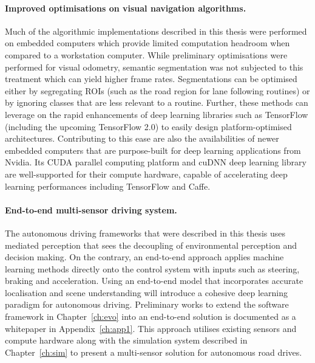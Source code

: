 \paragraph{Improved optimisations on visual navigation algorithms.} Much of the algorithmic implementations described in this thesis were performed on embedded computers which provide limited computation headroom when compared to a workstation computer. While preliminary optimisations were performed for visual odometry, semantic segmentation was not subjected to this treatment which can yield higher frame rates. Segmentations can be optimised either by segregating ROIs (such as the road region for lane following routines) or by ignoring classes that are less relevant to a routine. Further, these methods can leverage on the rapid enhancements of deep learning libraries such as TensorFlow (including the upcoming TensorFlow 2.0) to easily design platform-optimised architectures. Contributing to this ease are also the availabilities of newer embedded computers that are purpose-built for deep learning applications from Nvidia. Its CUDA parallel computing platform and cuDNN deep learning library are well-supported for their compute hardware, capable of accelerating deep learning performances including TensorFlow and Caffe.

\paragraph{End-to-end multi-sensor driving system.} The autonomous driving frameworks that were described in this thesis uses mediated perception that sees the decoupling of environmental perception and decision making. On the contrary, an end-to-end approach applies machine learning methods directly onto the control system with inputs such as steering, braking and acceleration. Using an end-to-end model that incorporates accurate localisation and scene understanding will introduce a cohesive deep learning paradigm for autonomous driving. Preliminary works to extend the software framework in Chapter~\ref{ch:evo} into an end-to-end solution is documented as a whitepaper in Appendix~\ref{ch:app1}. This approach utilises existing sensors and compute hardware along with the simulation system described in Chapter~\ref{ch:sim} to present a multi-sensor solution for autonomous road drives. %


